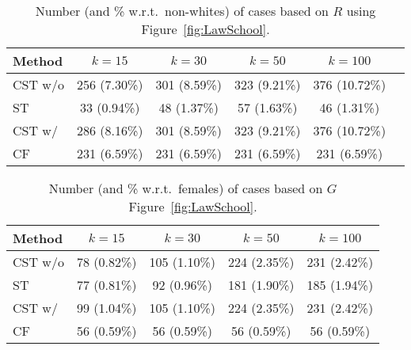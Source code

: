 %
\begin{table}[H]
  \caption{Number (and \% w.r.t.~non-whites) of cases based on $R$ using Figure~\ref{fig:LawSchool}.}
  \label{table:k-results_RACE_tau005}
  \centering
  \begin{tabular}{lccccc}
    \toprule
    Method & $k=15$ & $k=30$ & $k=50$ & $k=100$ \\
    \midrule
    CST w/o & 256 (7.30\%) & 301 (8.59\%) & 323 (9.21\%) & 376 (10.72\%)  \\
    ST & 33 (0.94\%) & 48 (1.37\%) & 57 (1.63\%) & 46 (1.31\%) \\
    CST w/ & 286 (8.16\%) & 301 (8.59\%) & 323 (9.21\%) & 376 (10.72\%)  \\
    CF &  231 (6.59\%) &  231 (6.59\%) &  231 (6.59\%) & 231 (6.59\%)  \\
    \bottomrule
  \end{tabular}
\end{table}
%
%
\begin{table}[H]
  \caption{Number (and \% w.r.t.~females) of cases based on $G$ Figure~\ref{fig:LawSchool}.}
  \label{table:k-results_GENDER_tau005}
  \centering
  \begin{tabular}{lcccc}
    \toprule
    Method & $k=15$ & $k=30$ & $k=50$ & $k=100$ \\
    \midrule
    CST w/o & 78 (0.82\%) & 105 (1.10\%) & 224 (2.35\%) & 231 (2.42\%)  \\
    ST & 77 (0.81\%) & 92 (0.96\%) & 181 (1.90\%) & 185 (1.94\%) \\
    CST w/ & 99 (1.04\%) & 105 (1.10\%) & 224 (2.35\%) & 231 (2.42\%)  \\
    CF &  56 (0.59\%) &  56 (0.59\%) &  56 (0.59\%) & 56 (0.59\%)  \\
    \bottomrule
  \end{tabular}
\end{table}
%

%
%




